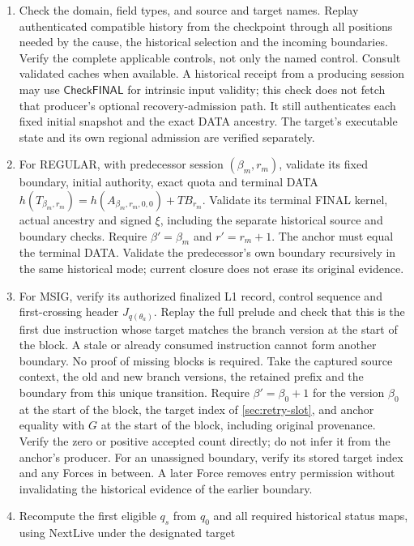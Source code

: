 \documentclass[11pt,a4paper]{article}
\newcommand{\TB}{\mathit{TB}}
\newcommand{\tagg}[1]{\ensuremath{\mathsf{#1}}}
\begin{document}
\begin{enumerate}[label=(\roman*),itemsep=2pt]
\item Check the domain, field types, and source and target names. Replay
authenticated compatible history from the checkpoint through all positions needed by
the cause, the historical selection and the incoming boundaries. Verify
the complete applicable controls, not only the named control. Consult
validated caches when available. A historical receipt from a producing
session may use \tagg{CheckFINAL} for intrinsic input validity; this check
does not fetch that producer's optional recovery-admission path. It still
authenticates each fixed initial snapshot and the exact DATA ancestry. The
target's executable state and its own regional admission are verified
separately.
\item For REGULAR, with predecessor session $(\beta_m,r_m)$, validate
its fixed boundary, initial authority, exact quota and terminal DATA
$h(T_{\beta_m,r_m})=h(A_{\beta_m,r_m,0,0})+\TB_{r_m}$. Validate its terminal
FINAL kernel, actual ancestry and signed $\xi$, including the separate
historical source and boundary checks. Require $\beta'=\beta_m$ and
$r'=r_m+1$. The anchor must equal the terminal DATA. Validate the
predecessor's own boundary recursively in the same historical mode;
current closure does not erase its original evidence.
\item For MSIG, verify its authorized finalized L1 record, control
sequence and first-crossing header $J_{q(\theta_a)}$. Replay the full
prelude and check that this is the first due instruction whose target
matches the branch version at the start of the block. A stale or already
consumed instruction cannot form another boundary. No proof of missing
blocks is required. Take the captured source context, the old and new
branch versions, the retained prefix and the boundary from this unique
transition. Require $\beta'=\beta_0+1$ for the version $\beta_0$ at the start of the block, the target index of
\cref{sec:retry-slot}, and anchor equality with $G$ at the start of the
block, including original provenance. Verify the zero or positive
accepted count directly; do not infer it from the anchor's producer. For
an unassigned boundary, verify its stored target index and any Forces in
between. A later Force removes entry permission without invalidating the
historical evidence of the earlier boundary.
\item Recompute the first eligible $q_s$ from $q_0$ and all required
historical status maps, using NextLive under the designated target

\end{enumerate}
\end{document}
